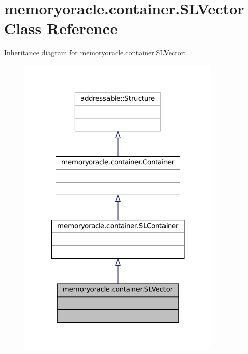 \hypertarget{classmemoryoracle_1_1container_1_1SLVector}{}\section{memoryoracle.\+container.\+S\+L\+Vector Class Reference}
\label{classmemoryoracle_1_1container_1_1SLVector}


Inheritance diagram for memoryoracle.\+container.\+S\+L\+Vector\+:\nopagebreak
\begin{figure}[H]
\begin{center}
\leavevmode
\includegraphics[width=275pt]{classmemoryoracle_1_1container_1_1SLVector__inherit__graph}
\end{center}
\end{figure}


